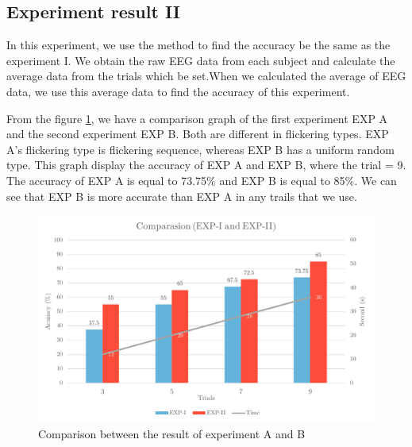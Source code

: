 \newpage
\subsection{Experiment result II}
\hspace{1.5cm} In this experiment, we use the method to find the accuracy be the same as the experiment I.
We obtain the raw EEG data from each subject and calculate the average data from the trials which be set.When we calculated the average of EEG data, we use this average data to find the accuracy of this experiment.

From the figure \ref{fig:comp2}, we have a comparison graph of the first experiment EXP A and the second experiment EXP B. Both are different in flickering types. EXP A's flickering type is flickering sequence, whereas EXP B has a uniform random type. This graph display the accuracy of EXP A and EXP B, where the trial = 9. The accuracy of EXP A is equal to 73.75\% and EXP B is equal to 85\%. We can see that EXP B is more accurate than EXP A in any trails that we use.

\begin{figure}[ht]
	\centering
	\includegraphics[scale = 0.8]{chapter7/result_12_2.pdf}
	\caption{Comparison between the result of experiment A and B}
    \label{fig:comp2}
\end{figure}

